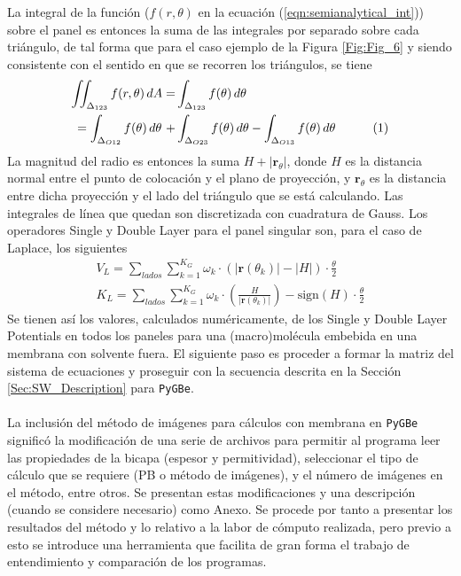 \documentclass[12pt, oneside, numbers, spanish]{ezthesis}
\newcommand\numberthis{\addtocounter{equation}{1}\tag{\theequation}}
\numberwithin{equation}{section}
\begin{document}
\noindent
La integral de la función ($f(r,\theta)$ en la ecuación (\ref{eqn:semianalytical_int})) sobre el panel es entonces la suma de las integrales por separado sobre cada triángulo, de tal forma que para el caso ejemplo de la Figura \ref{Fig:Fig_6} y siendo consistente con el sentido en que se recorren los triángulos, se tiene
\begin{align*}
\iint_{\Delta_{123}}f(r,\theta)\, dA =& \int_{\Delta_{123}}f(\theta)\, d\theta \\
= \int_{\Delta_{O12}}f(\theta)\, d\theta\, \, + & \int_{\Delta_{O23}}f(\theta)\, d\theta - \int_{\Delta_{O13}}f(\theta)\, d\theta& \numberthis \label{eqn:semianalytical_int}
\end{align*}
La magnitud del radio es entonces la suma $H + |\mathbf{r}_\theta|$, donde $H$ es la distancia normal entre el punto de colocación y el plano de proyección, y $\mathbf{r}_\theta$ es la distancia entre dicha proyección y el lado del triángulo que se está calculando. Las integrales de línea que quedan son discretizada con cuadratura de Gauss. Los operadores Single y Double Layer para el panel singular son, para el caso de Laplace, los siguientes
\begin{gather}
V_L = \sum_{lados}\sum_{k=1}^{K_G}\omega_k\cdot (|\mathbf{r}(\theta_k)| - |H|)\cdot\frac{\theta}{2}\\
K_L = \sum_{lados}\sum_{k=1}^{K_G}\omega_k\cdot \left(\frac{H}{|\mathbf{r}(\theta_k)|}\right) - \text{sign}(H) \cdot\frac{\theta}{2}
\end{gather}
Se tienen así los valores, calculados numéricamente, de los Single y Double Layer Potentials en todos los paneles para una (macro)molécula embebida en una membrana con solvente fuera. El siguiente paso es proceder a formar la matriz del sistema de ecuaciones y proseguir con la secuencia descrita en la Sección \ref{Sec:SW_Description} para \texttt{PyGBe}.\\\\
La inclusión del método de imágenes para cálculos con membrana en \texttt{PyGBe} significó la modificación de una serie de archivos para permitir al programa leer las propiedades de la bicapa (espesor y permitividad), seleccionar el tipo de cálculo que se requiere (PB o método de imágenes), y el número de imágenes en el método, entre otros. Se presentan estas modificaciones y una descripción (cuando se considere necesario) como Anexo. Se procede por tanto a presentar los resultados del método y lo relativo a la labor de cómputo realizada, pero previo a esto se introduce una herramienta que facilita de gran forma el trabajo de entendimiento y comparación de los programas.
\end{document}
